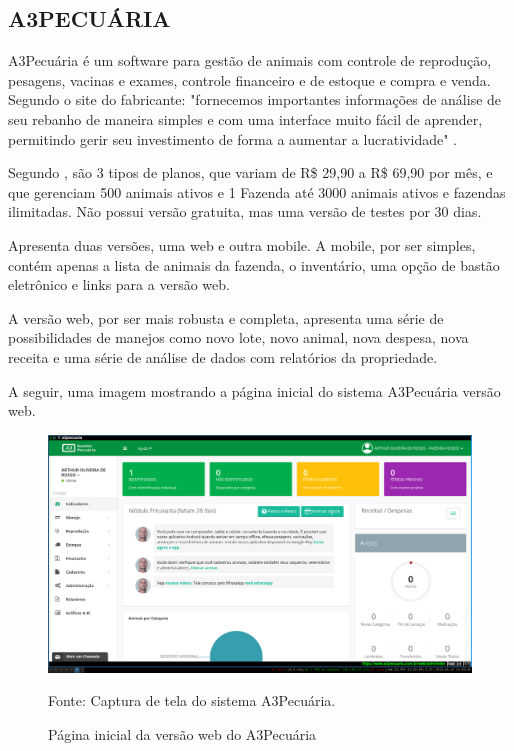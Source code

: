 


\subsection{A3PECUÁRIA}

A3Pecuária é um software para gestão de animais com controle de reprodução, pesagens, vacinas e exames, controle financeiro e de estoque e compra e venda. Segundo o site do fabricante: "fornecemos importantes informações de análise de seu rebanho de maneira simples e com uma interface muito fácil de aprender, permitindo gerir seu investimento de forma a aumentar a lucratividade"  \cite{a3pecuaria16}.

Segundo , são 3 tipos de planos, que variam de R\$ 29,90 a R\$ 69,90 por mês, e que gerenciam 500 animais ativos e 1 Fazenda até 3000 animais ativos e fazendas ilimitadas. Não possui versão gratuita, mas uma versão de testes por 30 dias.

Apresenta duas versões, uma web e outra mobile. A mobile, por ser simples, contém apenas a lista de animais da fazenda, o inventário, uma opção de bastão eletrônico e links para a versão web.

A versão web, por ser mais robusta e completa, apresenta uma série de possibilidades de manejos como novo lote, novo animal, nova despesa, nova receita e uma série de análise de dados com relatórios da propriedade.

A seguir, uma imagem mostrando a página inicial do sistema A3Pecuária versão web.


\begin{figure}[!h]
	\begin{center}
		\caption{Página inicial da versão web do A3Pecuária}
		\includegraphics[width=\textwidth]{../img/a3pecuaria.png}

		Fonte: Captura de tela do sistema A3Pecuária.
	\end{center}
\end{figure}

